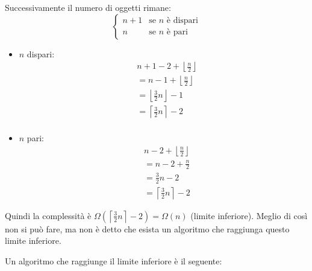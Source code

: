 \documentclass[a4paper]{article}
\begin{document}
\begin{itemize}
    \vspace{1em}
    \noindent
    Successivamente il numero di oggetti rimane:
    \[
      \begin{cases}
        n+1 & \text{se } n \text{ è dispari}\\
        n & \text{se } n \text{ è pari}
      \end{cases}
    \]
    \begin{itemize}
      \item \( n \) dispari:
        \[
          \begin{aligned}
            &n+1 - 2 + \left\lfloor \frac{n}{2} \right\rfloor\\
            &= n-1 + \left\lfloor \frac{n}{2} \right\rfloor\\
            &= \left\lfloor \frac{3}{2}n \right\rfloor - 1\\
            &= \left\lceil \frac{3}{2}n \right\rceil - 2\\
          \end{aligned}
        \]

      \item \( n \) pari:
        \[
          \begin{aligned}
            &n - 2 + \left\lfloor \frac{n}{2} \right\rfloor \\
            &= n-2 + \frac{n}{2}\\
            &= \frac{3}{2}n - 2\\
            &= \left\lceil \frac{3}{2}n \right\rceil -2
          \end{aligned}
        \]
    \end{itemize}
    Quindi la complessità è \( \Omega(\left\lceil \frac{3}{2}n \right\rceil -2) = \Omega(n)
    \) (limite inferiore). Meglio di così non si può fare, ma non è detto che esista
    un algoritmo che raggiunga questo limite inferiore.
\end{itemize}
Un algoritmo che raggiunge il limite inferiore è il seguente:
\end{document}
